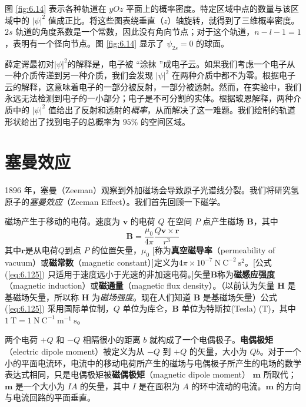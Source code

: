     图 \ref{fig:6.14} 表示各种轨道在 $yOz$ 平面上的概率密度。特定区域中点的数量与该区域中的 $\left|\psi\right|^2$ 值成正比。将这些图表绕垂直（$z$）轴旋转，就得到了三维概率密度。$2s$ 轨道的角度系数是一个常数，因此没有角向节点；对于这个轨道，$n-l-1=1$，表明有一个径向节点。图 \ref{fig:6.14} 显示了 $\psi_{2s}=0$ 的球面。

    薛定谔最初对$\left|\psi\right|^2$的解释是，电子被 “涂抹 ”成电子云。如果我们考虑一个电子从一种介质传递到另一种介质，我们会发现 $\left|\psi\right|^2$ 在两种介质中都不为零。根据电子云的解释，这意味着电子的一部分被反射，一部分被透射。然而，在实验中，我们永远无法检测到电子的一小部分；电子是不可分割的实体。根据玻恩解释，两种介质中的 $\left|\psi\right|^2$ 值给出了反射和透射的\textit{概率}，从而解决了这一难题。我们绘制的轨道形状给出了找到电子的总概率为 $95\%$ 的空间区域。

\section{塞曼效应}
\label{sec:6.8 Zeeman effect}
    1896 年，塞曼（Zeeman）观察到外加磁场会导致原子光谱线分裂。我们将研究氢原子的\textit{塞曼效应}（Zeeman Effect）。我们首先回顾一下磁学。

    磁场产生于移动的电荷。速度为 $\mathbf{v}$ 的电荷 $Q$ 在空间 $P$ 点产生磁场 $\mathbf{B}$，其中
    \begin{equation}
        \mathbf{B} = \frac{\mu_0}{4\pi}\frac{Q\mathbf{v}\times\mathbf{r}}{r^3}
        \label{eq:6.125}
    \end{equation}
    其中$\mathbf{r}$是从电荷$Q$到点 $P$ 的位置矢量，$\mu_0$ [称为\textbf{真空磁导率}（permeability of vacuum）或\textbf{磁常数}（magnetic constant）]定义为$4\pi\times 10^{-7}\:\mathrm{N} \:\mathrm{C}^{-2}\: \mathrm{s}^{2}$。[公式 (\ref{eq:6.125}) 只适用于速度远小于光速的非加速电荷。]矢量$\mathbf{B}$称为\textbf{磁感应强度}（magnetic induction）或\textbf{磁通量}（magnetic flux density）。（以前认为矢量 $\mathbf{H}$ 是基磁场矢量，所以称 $\mathbf{H}$ 为\textit{磁场强度}。现在人们知道 $\mathbf{B}$ 是基磁场矢量）公式 (\ref{eq:6.125}) 采用国际单位制，$Q$ 单位为库仑，$\mathbf{B}$ 单位为特斯拉(Tesla) (T)，其中$1\:\mathrm{T} = 1\:\mathrm{N}\:\mathrm{C}^{-1}\:\mathrm{m}^{-1} \: \mathrm{s}$。

    两个电荷 $+Q$ 和 $-Q$ 相隔很小的距离 $b$ 就构成了一个电偶极子。\textbf{电偶极矩}（electric dipole moment）被定义为从 $-Q$ 到 $+Q$ 的矢量，大小为 $Qb$。对于一个小的平面电流环，电流中的移动电荷所产生的磁场与电偶极子所产生的电场的数学表达式相同，只是电偶极矩被\textbf{磁偶极矩}（magnetic dipole moment） $\mathbf{m}$ 所取代；$\mathbf{m}$ 是一个大小为 $IA$ 的矢量，其中 $I$ 是在面积为 $A$ 的环中流动的电流。$\mathbf{m}$ 的方向与电流回路的平面垂直。

